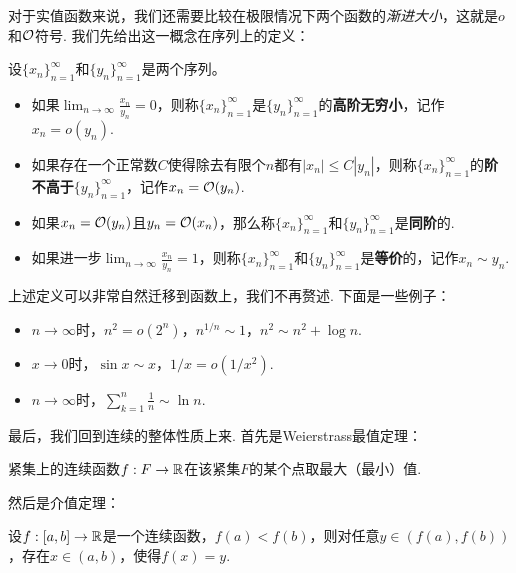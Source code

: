 对于实值函数来说，我们还需要比较在极限情况下两个函数的\emph{渐进大小}，这就是$o$和$\mathcal{O}$符号. 我们先给出这一概念在序列上的定义：

\begin{definition}[阶，无穷小，等价]
    设$\{x_n\}_{n=1}^\infty$和$\{y_n\}_{n=1}^\infty$是两个序列。
\begin{itemize}
    \item  如果$\lim_{n\to\infty}\frac{x_n}{y_n}=0$，则称$\{x_n\}_{n=1}^\infty$是$\{y_n\}_{n=1}^\infty$的\textbf{高阶无穷小}，记作$x_n=o(y_n)$.
    \item 如果存在一个正常数$C$使得除去有限个$n$都有$|x_n|\leq C |y_n|$，则称$\{x_n\}_{n=1}^\infty$的\textbf{阶不高于}$\{y_n\}_{n=1}^\infty$，记作$x_n=\mathcal{O}(y_n)$.
    \item 如果$x_n=\mathcal{O}(y_n)$且$y_n=\mathcal{O}(x_n)$，那么称$\{x_n\}_{n=1}^\infty$和$\{y_n\}_{n=1}^\infty$是\textbf{同阶}的.
    \item 如果进一步$\lim_{n\to\infty}\frac{x_n}{y_n}=1$，则称$\{x_n\}_{n=1}^\infty$和$\{y_n\}_{n=1}^\infty$是\textbf{等价}的，记作$x_n\sim y_n$.
\end{itemize}
\end{definition}

上述定义可以非常自然迁移到函数上，我们不再赘述. 下面是一些例子：

\begin{example}
\begin{itemize}
    \item $n\to\infty$时，$n^2=o(2^n)$，$n^{1/n}\sim 1$，$n^2\sim n^2+\log n$.
    \item $x\to 0$时，$\sin x\sim x$，$1/x=o(1/x^2)$. 
    \item $n\to\infty$时，$\sum_{k=1}^n\frac{1}{n}\sim\ln n$.
\end{itemize}
\end{example}

最后，我们回到连续的整体性质上来. 首先是Weierstrass最值定理：

\begin{theorem}[Weierstrass最值定理]\label{thm:weierstrass}
    紧集上的连续函数$f:F\to\mathbb{R}$在该紧集$F$的某个点取最大（最小）值. 
\end{theorem}

然后是介值定理：
\begin{theorem}[介值定理]\label{thm:intermediate}
    设$f:[a,b]\to\mathbb{R}$是一个连续函数，$f(a)<f(b)$，则对任意$y\in(f(a),f(b))$，存在$x\in(a,b)$，使得$f(x)=y$.
\end{theorem}

